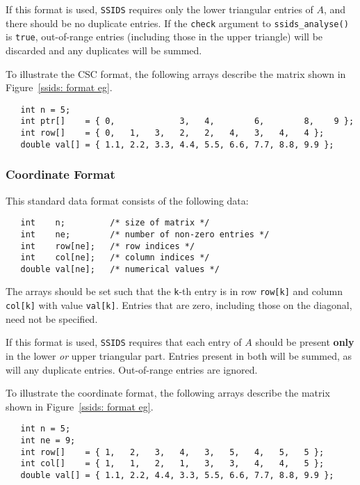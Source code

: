 If this format is used, \texttt{SSIDS} requires only the lower triangular entries of $A$, and there 
should be no duplicate entries. If the \texttt{check}
argument to
\texttt{ssids\_analyse()} is \texttt{true}, out-of-range entries (including
those in the upper triangle) will be discarded and any duplicates will be
summed.

To illustrate the CSC format, the following arrays describe the matrix shown in
Figure~\ref{ssids: format eg}.
\begin{verbatim}
   int n = 5;
   int ptr[]    = { 0,             3,   4,        6,        8,    9 };
   int row[]    = { 0,   1,   3,   2,   2,   4,   3,   4,   4 };
   double val[] = { 1.1, 2.2, 3.3, 4.4, 5.5, 6.6, 7.7, 8.8, 9.9 };
\end{verbatim}

\subsubsection{Coordinate Format} \label{ssids: coordformat}
This standard data format consists of the following data:
\begin{verbatim}
   int    n;         /* size of matrix */
   int    ne;        /* number of non-zero entries */
   int    row[ne];   /* row indices */
   int    col[ne];   /* column indices */
   double val[ne];   /* numerical values */
\end{verbatim}
The arrays should be set such that the \texttt{k}-th entry is in row
\texttt{row[k]} and column \texttt{col[k]} with value \texttt{val[k]}.
Entries that are zero, including those on the diagonal, need not be specified.

If this format is used,
\texttt{SSIDS} requires that each entry of $A$ should be present \textbf{only} in the
lower \textit{or} upper triangular part. Entries present in both will be summed, as
will any duplicate entries. Out-of-range entries are ignored.

To illustrate the coordinate format, the following arrays describe the matrix shown in
Figure~\ref{ssids: format eg}.
\begin{verbatim}
   int n = 5;
   int ne = 9;
   int row[]    = { 1,   2,   3,   4,   3,   5,   4,   5,   5 };
   int col[]    = { 1,   1,   2,   1,   3,   3,   4,   4,   5 };
   double val[] = { 1.1, 2.2, 4.4, 3.3, 5.5, 6.6, 7.7, 8.8, 9.9 };
\end{verbatim}


